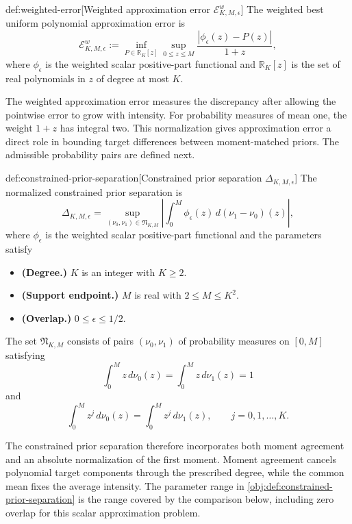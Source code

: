\documentclass[11pt]{article}
\begin{document}
\begin{definitionv}{def:weighted-error}[Weighted approximation error \(\mathcal E_{K,M,\epsilon}^{w}\)]
The weighted best uniform polynomial approximation error is
\[
\mathcal E_{K,M,\epsilon}^{w}
:=
\inf_{P\in\mathbb R_K[z]}
\sup_{0\le z\le M}
\frac{|\phi_\epsilon(z)-P(z)|}{1+z},
\]
where \(\phi_\epsilon\) is the weighted scalar positive-part functional and \(\mathbb R_K[z]\) is the set of real polynomials in \(z\) of degree at most \(K\).
\end{definitionv}

The weighted approximation error  measures the discrepancy after allowing the pointwise error to grow with intensity. For probability measures of mean one, the weight \(1+z\) has integral two. This normalization gives approximation error a direct role in bounding target differences between moment-matched priors. The admissible probability pairs are defined next.

\begin{definitionv}{def:constrained-prior-separation}[Constrained prior separation \(\Delta_{K,M,\epsilon}\)]
The normalized constrained prior separation is
\[
\Delta_{K,M,\epsilon}
=
\sup_{(\nu_0,\nu_1)\in\mathfrak N_{K,M}}
\left|
\int_0^M\phi_\epsilon(z)\,d(\nu_1-\nu_0)(z)
\right|,
\]
where \(\phi_\epsilon\) is the weighted scalar positive-part functional and the parameters satisfy
\begin{itemize}
\item \textbf{(Degree.)} \(K\) is an integer with \(K\geq2\).
\item \textbf{(Support endpoint.)} \(M\) is real with \(2\leq M\leq K^2\).
\item \textbf{(Overlap.)} \(0\leq\epsilon\leq1/2\).
\end{itemize}
The set \(\mathfrak N_{K,M}\) consists of pairs \((\nu_0,\nu_1)\) of probability measures on \([0,M]\) satisfying
\[
\int_0^M z\,d\nu_0(z)
=
\int_0^M z\,d\nu_1(z)
=1
\]
and
\[
\int_0^M z^j\,d\nu_0(z)
=
\int_0^M z^j\,d\nu_1(z),
\qquad j=0,1,\ldots,K.
\]
\end{definitionv}

The constrained prior separation  therefore incorporates both moment agreement and an absolute normalization of the first moment. Moment agreement cancels polynomial target components through the prescribed degree, while the common mean fixes the average intensity. The parameter range in \cref{obj:def:constrained-prior-separation} is the range covered by the comparison below, including zero overlap for this scalar approximation problem.
\end{document}

